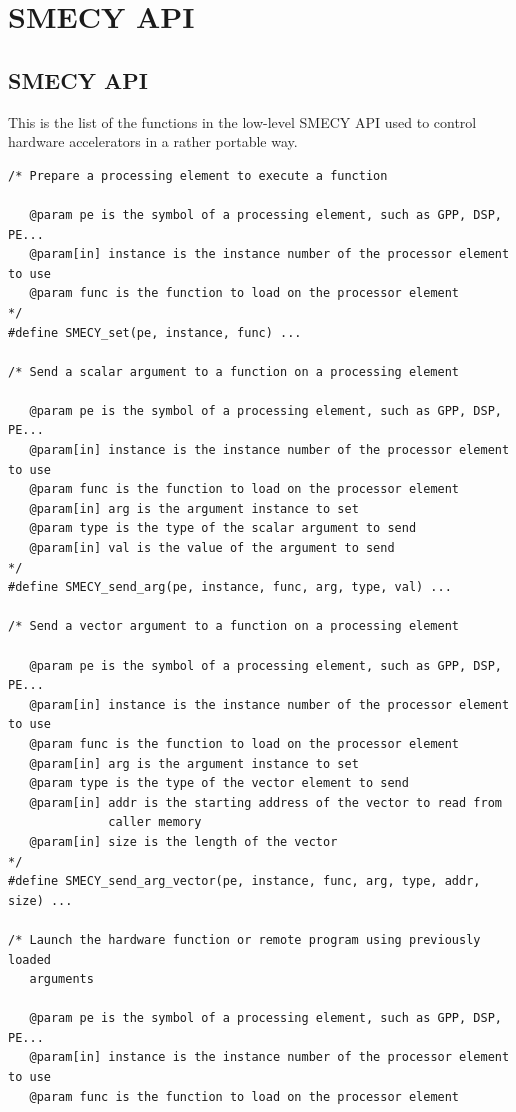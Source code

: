\documentclass[a4paper]{article}
\begin{document}
	
	\newpage
	\appendix
	\section{SMECY API}
	\label{api}
	\subsection{SMECY API}
	This is the list of the functions in the low-level SMECY API
    \cite{smec} used to control hardware accelerators in a rather portable
    way.
	\begin{lstlisting}[frame=none,numbers=none]
/* Prepare a processing element to execute a function

   @param pe is the symbol of a processing element, such as GPP, DSP, PE...
   @param[in] instance is the instance number of the processor element to use
   @param func is the function to load on the processor element
*/
#define SMECY_set(pe, instance, func) ...

/* Send a scalar argument to a function on a processing element

   @param pe is the symbol of a processing element, such as GPP, DSP, PE...
   @param[in] instance is the instance number of the processor element to use
   @param func is the function to load on the processor element
   @param[in] arg is the argument instance to set
   @param type is the type of the scalar argument to send
   @param[in] val is the value of the argument to send
*/
#define SMECY_send_arg(pe, instance, func, arg, type, val) ...

/* Send a vector argument to a function on a processing element

   @param pe is the symbol of a processing element, such as GPP, DSP, PE...
   @param[in] instance is the instance number of the processor element to use
   @param func is the function to load on the processor element
   @param[in] arg is the argument instance to set
   @param type is the type of the vector element to send
   @param[in] addr is the starting address of the vector to read from
              caller memory
   @param[in] size is the length of the vector
*/
#define SMECY_send_arg_vector(pe, instance, func, arg, type, addr, size) ...

/* Launch the hardware function or remote program using previously loaded
   arguments

   @param pe is the symbol of a processing element, such as GPP, DSP, PE...
   @param[in] instance is the instance number of the processor element to use
   @param func is the function to load on the processor element


\end{lstlisting}
\end{document}

